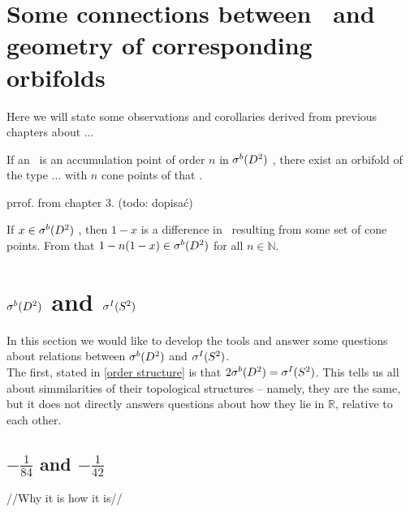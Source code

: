\section{Some connections between \Eoc\ and geometry of corresponding orbifolds}
Here we will state some observations and corollaries derived from previous chapters 
about ... 
\begin{observation}
If an \Eoc\ is an accumulation point of order $n$ in ${\mathcal{\sigma}^b(D^2)}$ \dsa{$\sIS$}, there exist an 
orbifold of the type ... \dsa{} with $n$ cone  points of that \Eoc. 
\end{observation}
prrof. from chapter 3. (todo: dopisać)
\begin{observation}\label{adding_multiplied_differences}
If $x \in {\mathcal{\sigma}^b(D^2)}$ \dsa{$\sIS$}, then $1-x$  is a difference in \Eoc\ resulting 
from some set of cone  points. From that $1-n(1-x) \in {\mathcal{\sigma}^b(D^2)}$  
for all $n \in \mathbb{N}$. 
\end{observation}

\section{${\mathcal{\sigma}^b(D^2)}$ and $\sIS$}
In this section we would like to develop the tools and answer some questions about 
relations between ${\mathcal{\sigma}^b(D^2)}$ and $\sIS$. \\
The first, stated in \ref{order structure} is that $2{\mathcal{\sigma}^b(D^2)}={\mathcal{\sigma}^I(S^2)}$. 
This tells us all about simmilarities of their topological structures -- namely, they are the same, 
but it does not directly answers questions about how they lie in $\mathbb{R}$, relative 
to each other. 
\subsection{$-\frac{1}{84}$ and $-\frac{1}{42}$}
//Why it is how it is//
